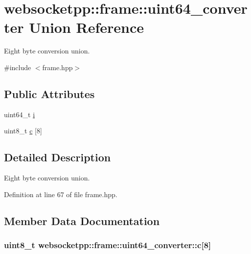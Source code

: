 \hypertarget{unionwebsocketpp_1_1frame_1_1uint64__converter}{}\section{websocketpp\+:\+:frame\+:\+:uint64\+\_\+converter Union Reference}
\label{unionwebsocketpp_1_1frame_1_1uint64__converter}


Eight byte conversion union.  




{\ttfamily \#include $<$frame.\+hpp$>$}

\subsection*{Public Attributes}
\begin{DoxyCompactItemize}
\item 
uint64\+\_\+t \hyperlink{unionwebsocketpp_1_1frame_1_1uint64__converter_a5440031a82ed910e25f6d75c59ab0a88}{i}
\item 
uint8\+\_\+t \hyperlink{unionwebsocketpp_1_1frame_1_1uint64__converter_a9d9e78c8c89d1eff191debf97f067731}{c} \mbox{[}8\mbox{]}
\end{DoxyCompactItemize}


\subsection{Detailed Description}
Eight byte conversion union. 

Definition at line 67 of file frame.\+hpp.



\subsection{Member Data Documentation}
\hypertarget{unionwebsocketpp_1_1frame_1_1uint64__converter_a9d9e78c8c89d1eff191debf97f067731}{}
\subsubsection[{c}]{\setlength{\rightskip}{0pt plus 5cm}uint8\+\_\+t websocketpp\+::frame\+::uint64\+\_\+converter\+::c\mbox{[}8\mbox{]}}\label{unionwebsocketpp_1_1frame_1_1uint64__converter_a9d9e78c8c89d1eff191debf97f067731}


